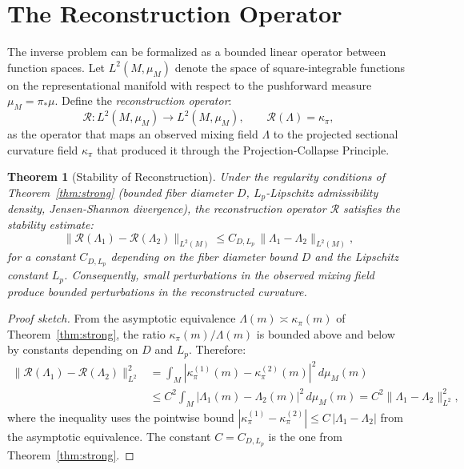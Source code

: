 \documentclass[12pt, oneside]{book}
\theoremstyle{plain-flyxion}
\newtheorem{theorem}{Theorem}[chapter]
\theoremstyle{definition-flyxion}
\newcommand{\kpi}{\kappa_{\pi}}
\newcommand{\Lam}{\Lambda}
\begin{document}
\section{The Reconstruction Operator}

The inverse problem can be formalized as a bounded linear operator between function spaces.
Let $L^2(M, \mu_M)$ denote the space of square-integrable functions on the representational
manifold with respect to the pushforward measure $\mu_M = \pi_* \mu$. Define the
\emph{reconstruction operator}:
\begin{equation}\label{eq:recon-op}
\mathcal{R}: L^2(M, \mu_M) \to L^2(M, \mu_M),
\qquad
\mathcal{R}(\Lam) = \kpi,
\end{equation}
as the operator that maps an observed mixing field $\Lam$ to the projected sectional
curvature field $\kpi$ that produced it through the Projection-Collapse Principle.

\begin{theorem}[Stability of Reconstruction]\label{thm:reconstruction}
Under the regularity conditions of Theorem~\ref{thm:strong} (bounded fiber diameter $D$,
$L_p$-Lipschitz admissibility density, Jensen-Shannon divergence), the reconstruction
operator $\mathcal{R}$ satisfies the stability estimate:
\begin{equation}\label{eq:stability}
\|\mathcal{R}(\Lam_1) - \mathcal{R}(\Lam_2)\|_{L^2(M)}
\leq C_{D, L_p}\, \|\Lam_1 - \Lam_2\|_{L^2(M)},
\end{equation}
for a constant $C_{D,L_p}$ depending on the fiber diameter bound $D$ and the Lipschitz
constant $L_p$. Consequently, small perturbations in the observed mixing field produce
bounded perturbations in the reconstructed curvature.
\end{theorem}

\begin{proof}[Proof sketch]
From the asymptotic equivalence $\Lam(m) \asymp \kpi(m)$ of Theorem~\ref{thm:strong},
the ratio $\kpi(m)/\Lam(m)$ is bounded above and below by constants depending on $D$ and
$L_p$. Therefore:
\begin{align*}
\|\mathcal{R}(\Lam_1) - \mathcal{R}(\Lam_2)\|_{L^2}^2
&= \int_M |\kpi^{(1)}(m) - \kpi^{(2)}(m)|^2\, d\mu_M(m) \\
&\leq C^2 \int_M |\Lam_1(m) - \Lam_2(m)|^2\, d\mu_M(m)
= C^2 \|\Lam_1 - \Lam_2\|_{L^2}^2,
\end{align*}
where the inequality uses the pointwise bound $|\kpi^{(1)} - \kpi^{(2)}| \leq
C\,|\Lam_1 - \Lam_2|$ from the asymptotic equivalence. The constant $C = C_{D,L_p}$
is the one from Theorem~\ref{thm:strong}.
\end{proof}
\end{document}
